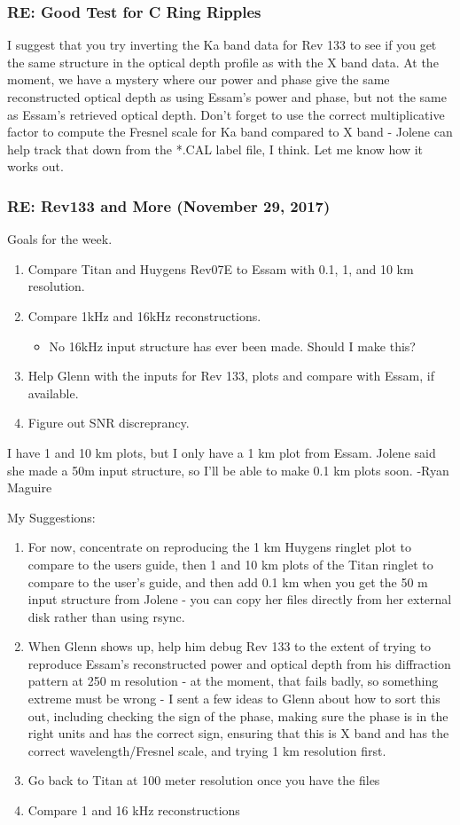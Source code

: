 \documentclass[crop=false,class=article,oneside]{standalone}
\begin{document}
\subsubsection{\footnotesize RE: Good Test for C Ring Ripples}
I suggest that you try inverting the Ka band data for Rev 133 to see if you get the same structure in the optical depth profile as with the X band data. At the moment, we have a mystery where our power and phase give the same reconstructed optical depth as using Essam's power and phase, but not the same as Essam's retrieved optical depth. Don't forget to use the correct multiplicative factor to compute the Fresnel scale for Ka band compared to X band - Jolene can help track that down from the *.CAL  label file, I think. Let me know how it works out.
\subsubsection{\footnotesize RE: Rev133 and More (November 29, 2017)}
Goals for the week.
\begin{enumerate}
    \item Compare Titan and Huygens Rev07E to Essam with 0.1, 1, and 10 km resolution.
    \item Compare 1kHz and 16kHz reconstructions.
    \begin{itemize}
        \item No 16kHz input structure has ever been made. Should I make this?
    \end{itemize}
    \item Help Glenn with the inputs for Rev 133, plots and compare with Essam, if available.
    \item Figure out SNR discreprancy.
\end{enumerate}
I have 1 and 10 km plots, but I only have a 1 km plot from Essam. Jolene said she made a 50m input structure, so I'll be able to make 0.1 km plots soon. -Ryan Maguire\par
My Suggestions:
\begin{enumerate}
    \item For now, concentrate on reproducing the 1 km Huygens ringlet plot to compare to the users guide, then 1 and 10 km plots of the Titan ringlet to compare to the user's guide, and then add 0.1 km when you get the 50 m input structure from Jolene - you can copy her files directly from her external disk rather than using rsync. 
    \item When Glenn shows up, help him debug Rev 133 to the extent of trying to reproduce Essam's reconstructed power and optical depth from his diffraction pattern at 250 m resolution - at the moment, that fails badly, so something extreme must be wrong - I sent a few ideas to Glenn about how to sort this out, including checking the sign of the phase, making sure the phase is in the right units and has the correct sign, ensuring that this is X band and has the correct wavelength/Fresnel scale, and trying 1 km resolution first. 
    \item Go back to Titan at 100 meter resolution once you have the files
    \item Compare 1 and 16 kHz reconstructions
\end{enumerate}
\end{document}
